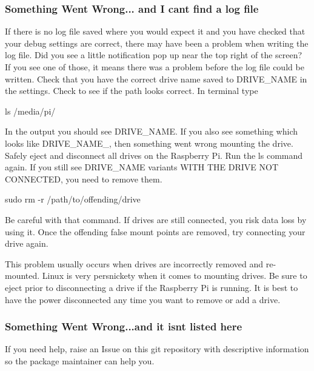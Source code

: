 \subsubsection*{Something Went Wrong... and I can\textquotesingle{}t find a log file}

If there is no log file saved where you would expect it and you have checked that your debug settings are correct, there may have been a problem when writing the log file. Did you see a little notification pop up near the top right of the screen? If you see one of those, it means there was a problem before the log file could be written. Check that you have the correct drive name saved to {\ttfamily D\+R\+I\+V\+E\+\_\+\+N\+A\+ME} in the settings. Check to see if the path looks correct. In terminal type


\begin{DoxyCode}
ls /media/pi/
\end{DoxyCode}
 In the output you should see {\ttfamily D\+R\+I\+V\+E\+\_\+\+N\+A\+ME}. If you also see something which looks like {\ttfamily D\+R\+I\+V\+E\+\_\+\+N\+A\+ME}\+\_, then something went wrong mounting the drive. Safely eject and disconnect all drives on the Raspberry Pi. Run the {\ttfamily ls} command again. If you still see {\ttfamily D\+R\+I\+V\+E\+\_\+\+N\+A\+ME} variants W\+I\+TH T\+HE D\+R\+I\+VE N\+OT C\+O\+N\+N\+E\+C\+T\+ED, you need to remove them.


\begin{DoxyCode}
sudo rm -r /path/to/offending/drive
\end{DoxyCode}


Be careful with that command. If drives are still connected, you risk data loss by using it. Once the offending false mount points are removed, try connecting your drive again.

This problem usually occurs when drives are incorrectly removed and re-\/mounted. Linux is very persnickety when it comes to mounting drives. Be sure to eject prior to disconnecting a drive if the Raspberry Pi is running. It is best to have the power disconnected any time you want to remove or add a drive.

\subsubsection*{Something Went Wrong...and it isn\textquotesingle{}t listed here}

If you need help, raise an Issue on this {\ttfamily git} repository with descriptive information so the package maintainer can help you.

